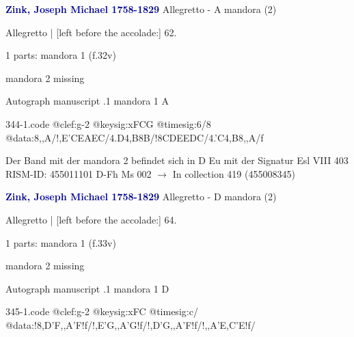 \documentclass[twocolumn]{book}
\begin{document}
\newline \par \vspace{7pt} \textcolor{darkblue}{\textbf{Zink, Joseph Michael  1758-1829}}
\newline Allegretto - A
\newline mandora (2)
\newline \begin{itshape}[f.32v, at left:] Allegretto | [left before the accolade:] 62.\end{itshape} 
\newline \textcolor{darkblue}{}  1 parts: mandora 1  (f.32v)
\newline \begin{small} mandora 2 missing\end{small} 
\newline Autograph manuscript
.1  mandora 1  A  
\begin{filecontents*}{344-1.code}
@clef:g-2
@keysig:xFCG
@timesig:6/8
@data:8,,A/!,E'CEAEC/4.D4,B8B/!8CDEEDC/4.'C4,B8,,A/f
\end{filecontents*}
\newline
%

\newline Der Band mit der mandora 2 befindet sich in D Eu mit der Signatur Esl VIII 403
\newline RISM-ID: 455011101
\newline D-Fh  Ms 002
\newline $\rightarrow$ In collection 419 (455008345)
      
\newline \par \vspace{7pt} \textcolor{darkblue}{\textbf{Zink, Joseph Michael  1758-1829}}
\newline Allegretto - D
\newline mandora (2)
\newline \begin{itshape}[f.33v, at left:] Allegretto | [left before the accolade:] 64.\end{itshape} 
\newline \textcolor{darkblue}{}  1 parts: mandora 1  (f.33v)
\newline \begin{small} mandora 2 missing\end{small} 
\newline Autograph manuscript
.1  mandora 1  D  
\begin{filecontents*}{345-1.code}
@clef:g-2
@keysig:xFC
@timesig:c/
@data:!{8,D'F,,A'F}!f/!{,E'G,,A'G}!f/!{,D'G,,A'F}!f/!{,,A'E,C'E}!f/
\end{filecontents*}
\newline
%
\end{document}
